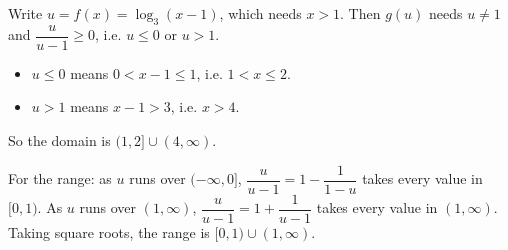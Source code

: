 Write $u=f(x)=\log_3(x-1)$, which needs $x>1$. Then $g(u)$ needs $u\ne1$ and $\dfrac{u}{u-1}\ge0$, i.e. $u\le0$ or $u>1$.
\begin{itemize}
\item $u\le0$ means $0<x-1\le1$, i.e. $1<x\le2$.
\item $u>1$ means $x-1>3$, i.e. $x>4$.
\end{itemize}
So the domain is $\boxed{(1,2]\cup(4,\infty)}$.

For the range: as $u$ runs over $(-\infty,0]$, $\dfrac{u}{u-1}=1-\dfrac{1}{1-u}$ takes every value in $[0,1)$. As $u$ runs over $(1,\infty)$, $\dfrac{u}{u-1}=1+\dfrac1{u-1}$ takes every value in $(1,\infty)$. Taking square roots, the range is $\boxed{[0,1)\cup(1,\infty)}$.
